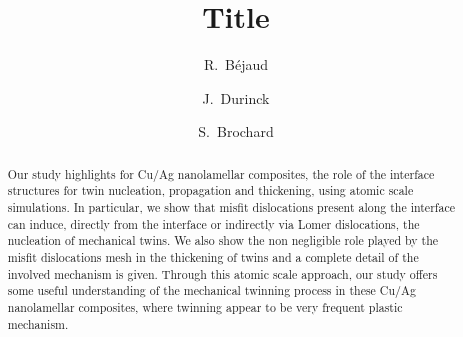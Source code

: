 \documentclass[final,3p,times,twocolumn]{elsarticle}
\begin{document}
\begin{frontmatter}



\title{Title}


\author[pprime]{R.~Béjaud}
\author[pprime]{J.~Durinck}
\author[pprime]{S.~Brochard}



\address[pprime]{Institut Pprime, CNRS - Université de Poitiers - ENSMA, UPR 3346, Département de Physique et Mécanique des Matériaux, Bvd M. et P. Curie, SP2MI, BP 30179, 86962 Futuroscope Chasseneuil Cedex, France}


\begin{abstract}
Our study highlights for Cu/Ag nanolamellar composites, the role of the interface structures for twin nucleation, propagation and thickening, using atomic scale simulations. In particular, we show that misfit dislocations present along the interface can induce, directly from the interface or indirectly via Lomer dislocations, the nucleation of mechanical twins. We also show the non negligible role played by the misfit dislocations mesh in the thickening of twins and a complete detail of the involved mechanism is given. Through this atomic scale approach, our study offers some useful understanding of the mechanical twinning process in these Cu/Ag nanolamellar composites, where twinning appear to be very frequent plastic mechanism.
\end{abstract}


\end{frontmatter}
\end{document}
